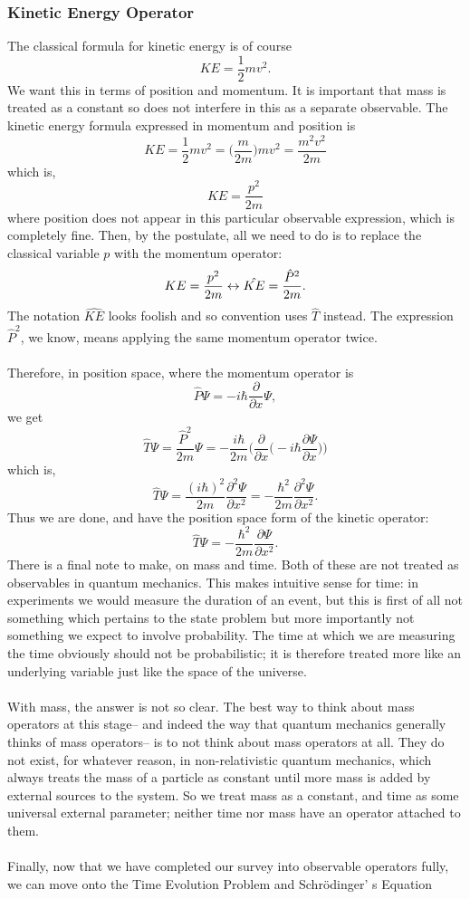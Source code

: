 \subsubsection{Kinetic Energy Operator}
The classical formula for kinetic energy is of course
$$
KE=\frac{1}{2}mv^2.
$$
We want this in terms of position and momentum. It is important that mass is treated as a constant so does not interfere in this as a separate observable. The kinetic energy formula expressed in momentum and position is 
$$
KE=\frac{1}{2}mv^2=\biggl(\frac{m}{2m}\biggr)mv^2=\frac{m^2v^2}{2m}
$$
which is, 
$$
KE=\frac{p^2}{2m}
$$
where position does not appear in this particular observable expression, which is completely fine. Then, by the postulate, all we need to do is to replace the classical variable $p$ with the momentum operator:
$$
KE=\frac{p^2}{2m}\leftrightarrow \hat{KE}=\frac{\hat{P}^2}{2m}.
$$
The notation $\hat{KE}$ looks foolish and so convention uses $\hat{T}$ instead. The expression $\hat{P}^2$, we know, means applying the same momentum operator twice.
\\\\
Therefore, in position space, where the momentum operator is 
$$
\hat{P}\Psi=-i\hbar\frac{\partial}{\partial x}\Psi,
$$
we get 
$$
\hat{T}\Psi=\frac{\hat{P}^2}{2m}\Psi=-\frac{i\hbar}{2m}\biggl(\frac{\partial}{\partial x}\biggl(-i\hbar\frac{\partial\Psi}{\partial x}\biggr)\biggr)
$$
which is, 
$$
\hat{T}{\Psi}=\frac{(i\hbar)^2}{2m}\frac{\partial^2 \Psi}{\partial x^2}=-\frac{\hbar^2}{2m}\frac{\partial^2 \Psi}{\partial x^2}.
$$
Thus we are done, and have the position space form of the kinetic operator:
$$
\hat{T}\Psi=-\frac{\hbar^2}{2m}\frac{\partial \Psi}{\partial x^2}.
$$
There is a final note to make, on mass and time. Both of these are not treated as observables in quantum mechanics. This makes intuitive sense for time: in experiments we would measure the duration of an event, but this is first of all not something which pertains to the state problem but more importantly not something we expect to involve probability. The time at which we are measuring the time obviously should not be probabilistic; it is therefore treated more like an underlying variable just like the space of the universe. 
\\\\
With mass, the answer is not so clear. The best way to think about mass operators at this stage-- and indeed the way that quantum mechanics generally thinks of mass operators-- is to not think about mass operators at all. They do not exist, for whatever reason, in non-relativistic quantum mechanics, which always treats the mass of a particle as constant until more mass is added by external sources to the system. So we treat mass as a constant, and time as some universal external parameter; neither time nor mass have an operator attached to them.
\\\\
Finally, now that we have completed our survey into observable operators fully, we can move onto the Time Evolution Problem and Schr\"{o}dinger'
s Equation
